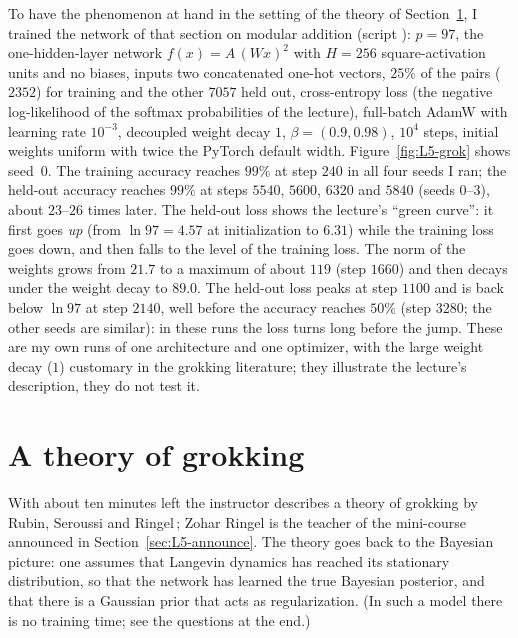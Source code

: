 \begin{beyond}
To have the phenomenon at hand in the setting of the theory of Section~\ref{sec:L5-theory}, I trained the network of that section on modular addition (script ): $p=97$, the one-hidden-layer network $f(x)=A\,(Wx)^2$ with $H=256$ square-activation units and no biases, inputs two concatenated one-hot vectors, $25\%$ of the pairs ($2352$) for training and the other $7057$ held out, cross-entropy loss (the negative log-likelihood of the softmax probabilities of the lecture), full-batch AdamW with learning rate $10^{-3}$, decoupled weight decay $1$, $\beta=(0.9,0.98)$, $10^4$ steps, initial weights uniform with twice the PyTorch default width. Figure~\ref{fig:L5-grok} shows seed~$0$. The training accuracy reaches $99\%$ at step $240$ in all four seeds I ran; the held-out accuracy reaches $99\%$ at steps $5540$, $5600$, $6320$ and $5840$ (seeds $0$--$3$), about $23$--$26$ times later. The held-out loss shows the lecture's ``green curve'': it first goes \emph{up} (from $\ln97=4.57$ at initialization to $6.31$) while the training loss goes down, and then falls to the level of the training loss. The norm of the weights grows from $21.7$ to a maximum of about $119$ (step $1660$) and then decays under the weight decay to $89.0$. The held-out loss peaks at step $1100$ and is back below $\ln97$ at step $2140$, well before the accuracy reaches $50\%$ (step $3280$; the other seeds are similar): in these runs the loss turns long before the jump. These are my own runs of one architecture and one optimizer, with the large weight decay ($1$) customary in the grokking literature; they illustrate the lecture's description, they do not test it.
\end{beyond}

\section{A theory of grokking}\label{sec:L5-theory}
With about ten minutes left the instructor describes a theory of grokking by Rubin, Seroussi and Ringel\,\citep{rubin2024}; Zohar Ringel is the teacher of the mini-course announced in Section~\ref{sec:L5-announce}. The theory goes back to the Bayesian picture: one assumes that Langevin dynamics has reached its stationary distribution, so that the network has learned the true Bayesian posterior, and that there is a Gaussian prior that acts as regularization. (In such a model there is no training time; see the questions at the end.)

